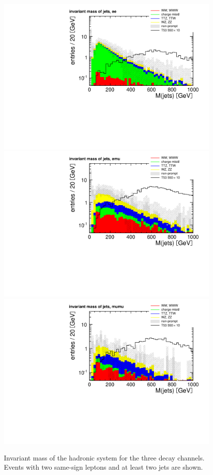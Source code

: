 \begin{figure}[htb]
    \centering
    \includegraphics[width=.7\textwidth]{images/pdf/had_mass_ee_0}
    \includegraphics[width=.7\textwidth]{images/pdf/had_mass_emu_0}
    \includegraphics[width=.7\textwidth]{images/pdf/had_mass_mumu_0}
    \caption{Invariant mass of the hadronic system for the three decay
    channels. Events with two same-sign leptons and at least
two jets are shown.}
    \label{fig:had_mass_app}
\end{figure}


